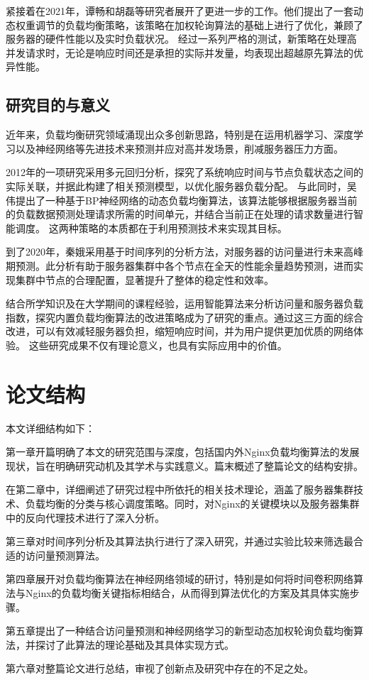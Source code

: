 紧接着在2021年，谭畅和胡磊等研究者展开了更进一步的工作\cite{谭畅2021云中心基于}。他们提出了一套动态权重调节的负载均衡策略，该策略在加权轮询算法的基础上进行了优化，兼顾了服务器的硬件性能以及实时负载状况。
经过一系列严格的测试，新策略在处理高并发请求时，无论是响应时间还是承担的实际并发量，均表现出超越原先算法的优异性能。

\subsection{研究目的与意义}

近年来，负载均衡研究领域涌现出众多创新思路，特别是在运用机器学习、深度学习以及神经网络等先进技术来预测并应对高并发场景，削减服务器压力方面。

2012年的一项研究采用多元回归分析，探究了系统响应时间与节点负载状态之间的实际关联，并据此构建了相关预测模型，以优化服务器负载分配。
与此同时，吴伟提出了一种基于BP神经网络的动态负载均衡算法，该算法能够根据服务器当前的负载数据预测处理请求所需的时间单元，并结合当前正在处理的请求数量进行智能调度。
这两种策略的本质都在于利用预测技术来实现其目标。

到了2020年，秦娥采用基于时间序列的分析方法，对服务器的访问量进行未来高峰期预测\cite{qbee}。此分析有助于服务器集群中各个节点在全天的性能余量趋势预测，进而实现集群中节点的合理配置，显著提升了整体的稳定性和效率。

结合所学知识及在大学期间的课程经验，运用智能算法来分析访问量和服务器负载指数，探究内置负载均衡算法的改进策略成为了研究的重点。通过这三方面的综合改进，可以有效减轻服务器负担，缩短响应时间，并为用户提供更加优质的网络体验。
这些研究成果不仅有理论意义，也具有实际应用中的价值。
\section{论文结构}

本文详细结构如下：

第一章开篇明确了本文的研究范围与深度，包括国内外Nginx负载均衡算法的发展现状，旨在明确研究动机及其学术与实践意义。篇末概述了整篇论文的结构安排。

在第二章中，详细阐述了研究过程中所依托的相关技术理论，涵盖了服务器集群技术、负载均衡的分类与核心调度策略。同时，对Nginx的关键模块以及服务器集群中的反向代理技术进行了深入分析。

第三章对时间序列分析及其算法执行进行了深入研究，并通过实验比较来筛选最合适的访问量预测算法。

第四章展开对负载均衡算法在神经网络领域的研讨，特别是如何将时间卷积网络算法与Nginx的负载均衡关键指标相结合，从而得到算法优化的方案及其具体实施步骤。

第五章提出了一种结合访问量预测和神经网络学习的新型动态加权轮询负载均衡算法，并探讨了此算法的理论基础及其具体实现方式。

第六章对整篇论文进行总结，审视了创新点及研究中存在的不足之处。
